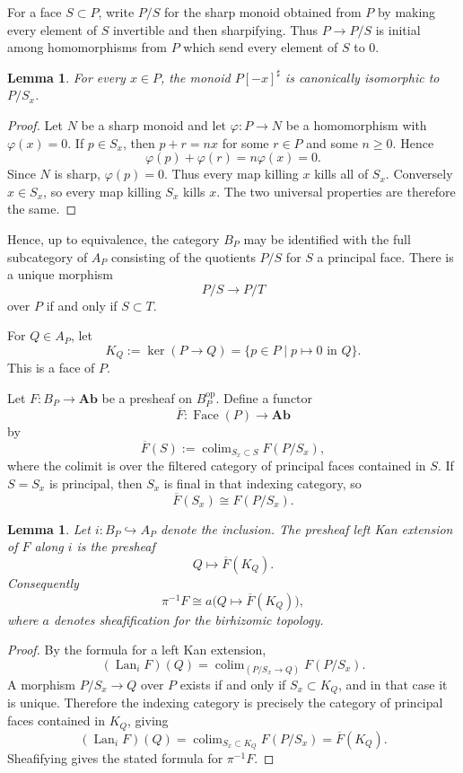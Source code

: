 \documentclass[11pt]{article}
\newtheorem{lemma}[theorem]{Lemma}
\DeclareMathOperator{\Lan}{Lan}
\DeclareMathOperator{\colim}{colim}
\DeclareMathOperator{\Face}{Face}
\begin{document}
For a face \(S\subset P\), write \(P/S\) for the sharp monoid obtained from \(P\) by making every element of \(S\) invertible and then sharpifying.  Thus \(P\to P/S\) is initial among homomorphisms from \(P\) which send every element of \(S\) to \(0\).

\begin{lemma}
For every \(x\in P\), the monoid \(P[-x]^\sharp\) is canonically isomorphic to \(P/S_x\).
\end{lemma}

\begin{proof}
Let \(N\) be a sharp monoid and let \(\varphi:P\to N\) be a homomorphism with \(\varphi(x)=0\).  If \(p\in S_x\), then \(p+r=n x\) for some \(r\in P\) and some \(n\geq 0\).  Hence
\[
\varphi(p)+\varphi(r)=n\varphi(x)=0.
\]
Since \(N\) is sharp, \(\varphi(p)=0\).  Thus every map killing \(x\) kills all of \(S_x\).  Conversely \(x\in S_x\), so every map killing \(S_x\) kills \(x\).  The two universal properties are therefore the same.
\end{proof}

Hence, up to equivalence, the category \(B_P\) may be identified with the full subcategory of \(A_P\) consisting of the quotients \(P/S\) for \(S\) a principal face.  There is a unique morphism
\[
P/S \longrightarrow P/T
\]
over \(P\) if and only if \(S\subset T\).

For \(Q\in A_P\), let
\[
K_Q := \ker(P\to Q)=\{p\in P\mid p\mapsto 0\text{ in }Q\}.
\]
This is a face of \(P\).

Let \(F:B_P\to \mathbf{Ab}\) be a presheaf on \(B_P^{\mathrm{op}}\).  Define a functor
\[
\overline F:\Face(P)\longrightarrow \mathbf{Ab}
\]
by
\[
\overline F(S):=\colim_{S_x\subset S} F(P/S_x),
\]
where the colimit is over the filtered category of principal faces contained in \(S\).  If \(S=S_x\) is principal, then \(S_x\) is final in that indexing category, so
\[
\overline F(S_x)\cong F(P/S_x).
\]

\begin{lemma}
Let \(i:B_P\hookrightarrow A_P\) denote the inclusion.  The presheaf left Kan extension of \(F\) along \(i\) is the presheaf
\[
Q\longmapsto \overline F(K_Q).
\]
Consequently
\[
\pi^{-1}F \cong a\bigl(Q\mapsto \overline F(K_Q)\bigr),
\]
where \(a\) denotes sheafification for the birhizomic topology.
\end{lemma}

\begin{proof}
By the formula for a left Kan extension,
\[
(\Lan_iF)(Q)=\colim_{(P/S_x\to Q)}F(P/S_x).
\]
A morphism \(P/S_x\to Q\) over \(P\) exists if and only if \(S_x\subset K_Q\), and in that case it is unique.  Therefore the indexing category is precisely the category of principal faces contained in \(K_Q\), giving
\[
(\Lan_iF)(Q)=\colim_{S_x\subset K_Q}F(P/S_x)=\overline F(K_Q).
\]
Sheafifying gives the stated formula for \(\pi^{-1}F\).
\end{proof}
\end{document}
